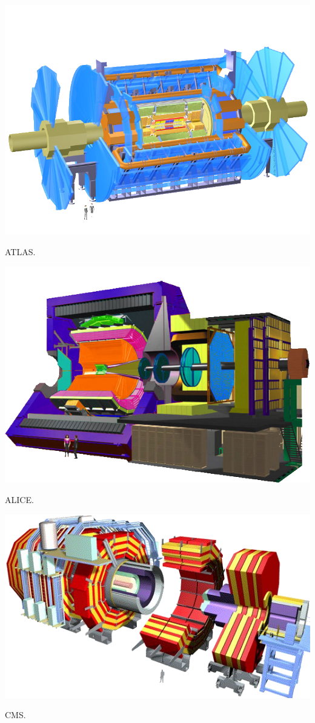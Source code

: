 \marginpar
{
	\includegraphics[width=\marginparwidth]{LHC/atlas.png}
	\captionsetup{type=figure}\caption{ATLAS.}
	\label{atlas}
}

\marginpar
{
	\includegraphics[width=\marginparwidth]{LHC/alice.png}
	\captionsetup{type=figure}\caption{ALICE.}
	\label{alice}
}

\marginpar
{
	\includegraphics[width=\marginparwidth]{LHC/cms.png}
	\captionsetup{type=figure}\caption{CMS.}
	\label{cms}
}

